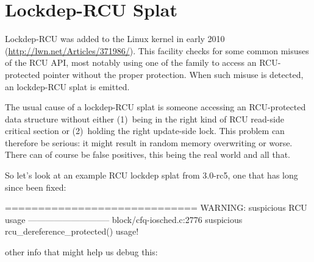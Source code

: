 
\section{Lockdep-RCU Splat}
\label{sec:rcu:Lockdep-RCU Splat}

Lockdep-RCU was added to the Linux kernel in early 2010
(\url{http://lwn.net/Articles/371986/}).
This facility checks for some common
misuses of the RCU API, most notably using one of the 
family to access an RCU-protected pointer without the proper protection.
When such misuse is detected, an lockdep-RCU splat is emitted.

The usual cause of a lockdep-RCU splat is someone accessing an
RCU-protected data structure without either (1)~being in the right kind of
RCU read-side critical section or (2)~holding the right update-side lock.
This problem can therefore be serious{:} it might result in random memory
overwriting or worse.
There can of course be false positives, this
being the real world and all that.

So let's look at an example RCU lockdep splat from 3.0-rc5, one that
has long since been fixed:

\begin{VerbatimU}
    =============================
    WARNING: suspicious RCU usage
    -----------------------------
    block/cfq-iosched.c:2776 suspicious rcu_dereference_protected() usage!
\end{VerbatimU}

\noindent%
other info that might help us debug this:

